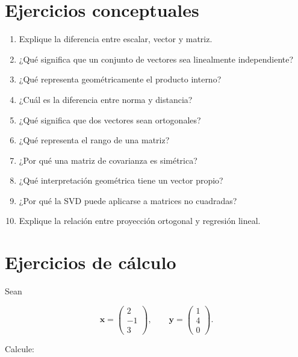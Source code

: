 \documentclass[
  spanish,
  10.5pt,
  letterpaper,
  DIV=11,
  numbers=noendperiod,
  oneside,
  open=any]{scrreprt}
\providecommand{\tightlist}{%
  \setlength{\itemsep}{0pt}\setlength{\parskip}{0pt}}
\theoremstyle{definition}
\theoremstyle{definition}
\theoremstyle{plain}
\theoremstyle{remark}
\begin{document}
\section*{Ejercicios conceptuales}\label{ejercicios-conceptuales-1}


\begin{enumerate}
\def\labelenumi{\arabic{enumi}.}
\tightlist
\item
  Explique la diferencia entre escalar, vector y matriz.
\item
  ¿Qué significa que un conjunto de vectores sea linealmente
  independiente?
\item
  ¿Qué representa geométricamente el producto interno?
\item
  ¿Cuál es la diferencia entre norma y distancia?
\item
  ¿Qué significa que dos vectores sean ortogonales?
\item
  ¿Qué representa el rango de una matriz?
\item
  ¿Por qué una matriz de covarianza es simétrica?
\item
  ¿Qué interpretación geométrica tiene un vector propio?
\item
  ¿Por qué la SVD puede aplicarse a matrices no cuadradas?
\item
  Explique la relación entre proyección ortogonal y regresión lineal.
\end{enumerate}

\section*{Ejercicios de cálculo}\label{ejercicios-de-cuxe1lculo}


Sean

\[
\mathbf{x}
=
\begin{pmatrix}
2\\
-1\\
3
\end{pmatrix},
\qquad
\mathbf{y}
=
\begin{pmatrix}
1\\
4\\
0
\end{pmatrix}.
\]

Calcule:
\end{document}
